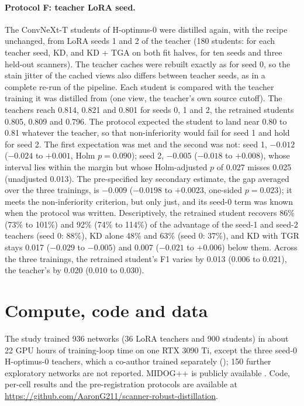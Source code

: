 \paragraph{Protocol F: teacher LoRA seed.} The ConvNeXt-T students of H-optimus-0 were distilled again, with the recipe
unchanged, from LoRA seeds 1 and 2 of the teacher (180 students: for each teacher seed, KD, and KD + TGA on both fit halves, for ten seeds and
three held-out scanners). The teacher caches were rebuilt exactly as for seed 0, so the stain jitter of the cached views
also differs between teacher seeds, as in a complete re-run of the pipeline. Each student is compared with the
teacher training it was distilled from (one view, the teacher's own source cutoff). The teachers reach 0.814, 0.821 and
0.801 for seeds 0, 1 and 2, the retrained students 0.805, 0.809 and 0.796. The protocol expected the student to land near
0.80 to 0.81 whatever the teacher, so that non-inferiority would fail for seed 1 and hold for seed 2. The first
expectation was met and the second was not: seed 1, $-0.012$ ($-0.024$ to $+0.001$, Holm $p=0.090$); seed 2, $-0.005$
($-0.018$ to $+0.008$), whose interval lies within the margin but whose Holm-adjusted $p$ of 0.027 misses 0.025
(unadjusted 0.013). The pre-specified key secondary estimate, the gap averaged over the three trainings, is $-0.009$
($-0.0198$ to $+0.0023$, one-sided $p=0.023$); it meets the non-inferiority criterion, but only just, and its seed-0 term
was known when the protocol was written. Descriptively, the retrained student recovers 86\% (73\% to 101\%) and 92\%
(74\% to 114\%) of the advantage of the seed-1 and seed-2 teachers (seed 0: 88\%), KD alone 48\% and 63\% (seed 0:
37\%), and KD with TGR stays 0.017 ($-0.029$ to $-0.005$) and 0.007 ($-0.021$ to $+0.006$) below them. Across the three
trainings, the retrained student's F1 varies by 0.013 (0.006 to 0.021), the teacher's by 0.020 (0.010 to 0.030).

\FloatBarrier
\section{Compute, code and data}
\label{app:compute}

The study trained 936 networks (36 LoRA teachers and 900 students) in about 22 GPU hours of training-loop time on
one RTX 3090 Ti, except the three seed-0 H-optimus-0 teachers, which a co-author trained separately
(); 150 further exploratory networks are not reported. MIDOG++ is publicly
available \citep{aubreville2023comprehensive}. Code, per-cell results and the pre-registration protocols are available at \url{https://github.com/AaronG211/scanner-robust-distillation}.


\FloatBarrier
